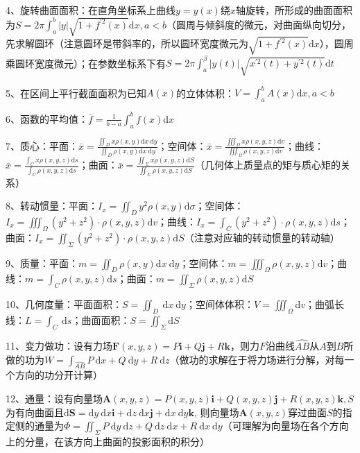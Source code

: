 4、旋转曲面面积：在直角坐标系上曲线$y=y(x)$绕$x$轴旋转，所形成的曲面面积为$S=2 \pi \int_{a}^{b}|y| \sqrt{1+f^{\prime 2}(x)} \mathrm{d} x, a<b$（圆周与倾斜度的微元，对曲面纵向切分，先求解圆环（注意圆环是带斜率的，所以圆环宽度微元为$\sqrt{1+f^{\prime 2}(x)} \mathrm{d} x$），圆周乘圆环宽度微元）；在参数坐标系下有$S=2 \pi \int_{a}^{\beta}|y(t)| \sqrt{x^{\prime 2}(t)+y^{\prime 2}(t)} \mathrm{d} t$

5、在区间上平行截面面积为已知$A(x)$的立体体积：$V=\int_{a}^{b} A(x) \mathrm{d} x, a<b$

6、函数的平均值：$\bar{f}=\frac{1}{b-a} \int_{a}^{b} f(x) \mathrm{d} x$

7、质心：平面：$\bar{x}=\frac{\iint_{D} x \rho(x, y) \mathrm{d} x \mathrm{~d} y}{\iint_{D} \rho(x, y) \mathrm{d} x \mathrm{~d} y}$；空间体：$\bar{x}=\frac{\iiint_{\Omega} x \rho(x, y, z) \mathrm{d} v}{\iiint_{\Omega} \rho(x, y, z) \mathrm{d} v}$；曲线：$\bar{x}=\frac{\int_{C} x \rho(x, y, z) \mathrm{d} s}{\int_{C} \rho(x, y, z) \mathrm{d} s}$；曲面：$\bar{x}=\frac{\iint_{\Sigma} x \rho(x, y, z) \mathrm{d} S}{\iint_{\Sigma} \rho(x, y, z) \mathrm{d} S}$（几何体上质量点的矩与质心矩的关系）

8、转动惯量：平面：$I_{x}=\iint_{D} y^{2} \rho(x, y) \mathrm{d} \sigma$；空间体：$I_{x}=\iiint_{\Omega}\left(y^{2}+z^{2}\right) \cdot \rho(x, y, z) \mathrm{d} v$；曲线：$I_{x}=\int_{C}\left(y^{2}+z^{2}\right) \cdot \rho(x, y, z) \mathrm{d} s$；曲面：$I_{x}=\iint_{\Sigma}\left(y^{2}+z^{2}\right) \cdot \rho(x, y, z) \mathrm{d} S$（注意对应轴的转动惯量的转动轴）

9、质量：平面：$m=\iint_{D} \rho(x, y) \mathrm{d} x \mathrm{~d} y$；空间体：$m=\iiint_{\Omega} \rho(x, y, z) \mathrm{d} v$；曲线：$m=\int_{C} \rho(x, y, z) \mathrm{d} s$；曲面：$m=\iint_{\Sigma} \rho(x, y, z) \mathrm{d} S$

10、几何度量：平面面积：$S=\iint_{D} \mathrm{~d} x \mathrm{~d} y$；空间体体积：$V=\iiint_{\Omega} \mathrm{d} v$；曲弧长线：$L=\int_{C} \mathrm{~d} s$；曲面面积：$S=\iint_{\Sigma} \mathrm{d} S$

11、变力做功：设有力场$\boldsymbol{F}(x, y, z)=P \boldsymbol{i}+Q \boldsymbol{j}+R \boldsymbol{k}$，则力$F$沿曲线$\widehat{A B}$从$A$到$B$所做的功为$W=\int_{\widehat{A B}} P \mathrm{~d} x+Q \mathrm{~d} y+R \mathrm{~d} z$（做功的求解在于将力场进行分解，对每一个方向的功分开计算）

12、通量：设有向量场$\boldsymbol{A}(x, y, z)=P(x, y, z) \boldsymbol{i}+Q(x, y, z) \boldsymbol{j}+R(x, y, z) \boldsymbol{k}, S$为有向曲面且$\mathrm{d} \boldsymbol{S}=\mathrm{d} y \mathrm{~d} x \boldsymbol{i}+\mathrm{d} z \mathrm{~d} x \boldsymbol{j}+\mathrm{d} x \mathrm{~d} y \boldsymbol{k}$, 则向量场$\boldsymbol{A}(x, y, z)$穿过曲面$S$的指定侧的通量为$\Phi=\iint_{\Sigma} P \mathrm{~d} y \mathrm{~d} z+Q \mathrm{~d} z \mathrm{~d} x+R \mathrm{~d} x \mathrm{~d} y$（可理解为向量场在各个方向上的分量，在该方向上曲面的投影面积的积分）


